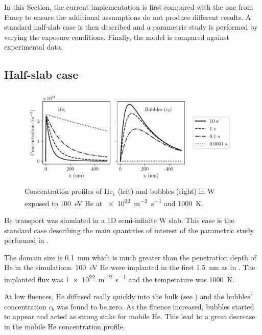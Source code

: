 In this Section, the current implementation is first compared with the one from Faney  to ensure the additional assumptions do not produce different results.
A standard half-slab case is then described and a parametric study is performed by varying the exposure conditions.
Finally, the model is compared against experimental data.

\subsection{Half-slab case} 

\begin{figure}
    \centering
    \includegraphics[width=\linewidth]{Figures/Chapter4/half_slab/profiles_half_slab.pdf}
    \caption{Concentration profiles of He$_1$ (left) and bubbles (right) in W exposed to \SI{100}{eV} He at \SI{e22}{m^{-2}.s^{-1}} and \SI{1000}{K}.}
\end{figure}

\gls{He} transport was simulated in a 1D semi-infinite \gls{W} slab.
This case is the standard case describing the main quantities of interest of the parametric study performed in .

The domain size is \SI{0.1}{mm} which is much greater than the penetration depth of \gls{He} in the simulations.
\SI{100}{eV} \gls{He} were implanted in the first \SI{1.5}{nm} as in .
The implanted flux was \SI{1e22}{m^{-2} s^{-1}} and the temperature was \SI{1000}{K}.

At low \glspl{fluence}, \gls{He} diffused really quickly into the bulk (see ) and the bubbles' concentration $c_b$ was found to be zero.
As the \gls{fluence} increased, bubbles started to appear and acted as strong sinks for mobile \gls{He}.
This lead to a great decrease in the mobile He concentration profile.

